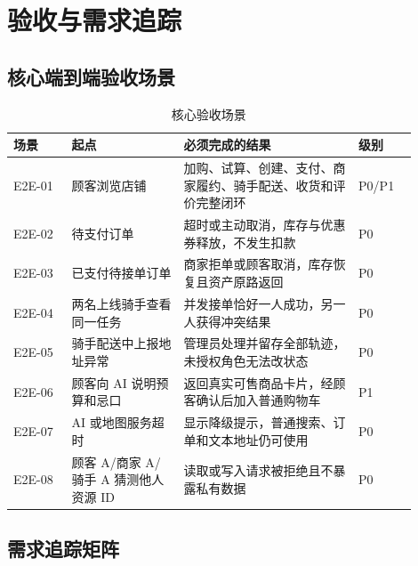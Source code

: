 \section{验收与需求追踪}

\subsection{核心端到端验收场景}

\begin{longtable}{|L{0.13\linewidth}|L{0.25\linewidth}|L{0.39\linewidth}|L{0.13\linewidth}|}
\caption{核心验收场景}\label{tab:e2e-acceptance}\\ \hline
\textbf{场景} & \textbf{起点} & \textbf{必须完成的结果} & \textbf{级别} \\ \hline
E2E-01 & 顾客浏览店铺 & 加购、试算、创建、支付、商家履约、骑手配送、收货和评价完整闭环 & P0/P1 \\ \hline
E2E-02 & 待支付订单 & 超时或主动取消，库存与优惠券释放，不发生扣款 & P0 \\ \hline
E2E-03 & 已支付待接单订单 & 商家拒单或顾客取消，库存恢复且资产原路返回 & P0 \\ \hline
E2E-04 & 两名上线骑手查看同一任务 & 并发接单恰好一人成功，另一人获得冲突结果 & P0 \\ \hline
E2E-05 & 骑手配送中上报地址异常 & 管理员处理并留存全部轨迹，未授权角色无法改状态 & P0 \\ \hline
E2E-06 & 顾客向 AI 说明预算和忌口 & 返回真实可售商品卡片，经顾客确认后加入普通购物车 & P1 \\ \hline
E2E-07 & AI 或地图服务超时 & 显示降级提示，普通搜索、订单和文本地址仍可使用 & P0 \\ \hline
E2E-08 & 顾客 A/商家 A/骑手 A 猜测他人资源 ID & 读取或写入请求被拒绝且不暴露私有数据 & P0 \\ \hline
\end{longtable}

\subsection{需求追踪矩阵}

